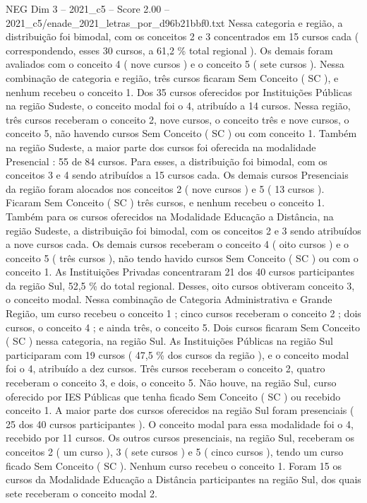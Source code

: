 \begin{textsample}{NEG Dim 3 – 2021\_c5 – Score 2.00 – 2021\_c5/enade\_2021\_letras\_por\_d96b21bbf0.txt}
Nessa categoria e região, a distribuição foi bimodal, com os conceitos 2 e 3 concentrados em 15 cursos cada ( correspondendo, esses 30 cursos, a 61,2 \% total regional ).
Os demais foram avaliados com o conceito 4 ( nove cursos ) e o conceito 5 ( sete cursos ).
Nessa combinação de categoria e região, três cursos ficaram Sem Conceito ( SC ), e nenhum recebeu o conceito 1.
Dos 35 cursos oferecidos por Instituições Públicas na região Sudeste, o conceito modal foi o 4, atribuído a 14 cursos.
Nessa região, três cursos receberam o conceito 2, nove cursos, o conceito três e nove cursos, o conceito 5, não havendo cursos Sem Conceito ( SC ) ou com conceito 1.
Também na região Sudeste, a maior parte dos cursos foi oferecida na modalidade Presencial : 55 de 84 cursos.
Para esses, a distribuição foi bimodal, com os conceitos 3 e 4 sendo atribuídos a 15 cursos cada.
Os demais cursos Presenciais da região foram alocados nos conceitos 2 ( nove cursos ) e 5 ( 13 cursos ).
Ficaram Sem Conceito ( SC ) três cursos, e nenhum recebeu o conceito 1.
Também para os cursos oferecidos na Modalidade Educação a Distância, na região Sudeste, a distribuição foi bimodal, com os conceitos 2 e 3 sendo atribuídos a nove cursos cada.
Os demais cursos receberam o conceito 4 ( oito cursos ) e o conceito 5 ( três cursos ), não tendo havido cursos Sem Conceito ( SC ) ou com o conceito 1.
As Instituições Privadas concentraram 21 dos 40 cursos participantes da região Sul, 52,5 \% do total regional.
Desses, oito cursos obtiveram conceito 3, o conceito modal.
Nessa combinação de Categoria Administrativa e Grande Região, um curso recebeu o conceito 1 ; cinco cursos receberam o conceito 2 ; dois cursos, o conceito 4 ; e ainda três, o conceito 5.
Dois cursos ficaram Sem Conceito ( SC ) nessa categoria, na região Sul.
As Instituições Públicas na região Sul participaram com 19 cursos ( 47,5 \% dos cursos da região ), e o conceito modal foi o 4, atribuído a dez cursos.
Três cursos receberam o conceito 2, quatro receberam o conceito 3, e dois, o conceito 5.
Não houve, na região Sul, curso oferecido por IES Públicas que tenha ficado Sem Conceito ( SC ) ou recebido conceito 1.
A maior parte dos cursos oferecidos na região Sul foram presenciais ( 25 dos 40 cursos participantes ).
O conceito modal para essa modalidade foi o 4, recebido por 11 cursos.
Os outros cursos presenciais, na região Sul, receberam os conceitos 2 ( um curso ), 3 ( sete cursos ) e 5 ( cinco cursos ), tendo um curso ficado Sem Conceito ( SC ).
Nenhum curso recebeu o conceito 1.
Foram 15 os cursos da Modalidade Educação a Distância participantes na região Sul, dos quais sete receberam o conceito modal 2.

\end{textsample}

